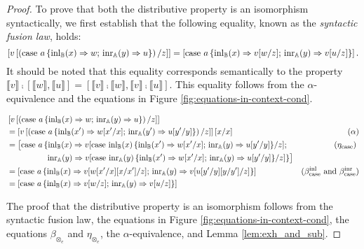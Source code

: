 \documentclass[10pt,a4paper]{amsart}
\theoremstyle{definition}
\theoremstyle{definition}
\theoremstyle{definition}
\theoremstyle{definition}
\theoremstyle{definition}
\theoremstyle{definition}
\begin{document}
\begin{proof}
 
  To prove that both the distributive property is an isomorphism syntactically, we first establish that the following equality, known  as the \emph{syntactic fusion law}, holds:
  \begin{equation*}
    \left[v\left[ \left(\text{case } a \,\{\mathrm{inl}_{\mathbb{B}}(x) \Rightarrow w ; \, \mathrm{inr}_{\mathbb{A}}(y) \Rightarrow u\}\right)  / z \right]\right] =   \left[\text{case } a \,\{\mathrm{inl}_{\mathbb{B}}(x) \Rightarrow v[w/z] ; \, \mathrm{inr}_{\mathbb{A}}(y) \Rightarrow v[u/z]\} \right].
  \end{equation*}
It should be noted that this equality corresponds semantically to the property  $ \llbracket v \rrbracket \comp [ \llbracket w \rrbracket,  \llbracket u \rrbracket] = [ \llbracket v \rrbracket \comp \llbracket w \rrbracket,\llbracket v \rrbracket \comp \llbracket u \rrbracket ] $.
This equality follows from the $\alpha$-equivalence and the equations in Figure \ref{fig:equations-in-context-cond}. 

\begin{align*}
  &\left[v\left[ \left(\text{case } a \,\{\mathrm{inl}_{\mathbb{B}}(x) \Rightarrow w ; \, \mathrm{inr}_{\mathbb{A}}(y) \Rightarrow u\}\right)  / z \right]\right] & \\
  & = \left[v\left[ \left(\text{case } a \,\{\mathrm{inl}_{\mathbb{B}}(x') \Rightarrow w[x'/x] ; \, \mathrm{inr}_{\mathbb{A}}(y') \Rightarrow u[y'/y]\}\right)  / z \right]\right] [x/x]  & (\alpha) \\
  & = \big[ \text{case } a \,\{\mathrm{inl}_{\mathbb{B}}(x) \Rightarrow v[\text{case } \mathrm{inl}_{\mathbb{B}}(x) \,\{\mathrm{inl}_{\mathbb{B}}(x') \Rightarrow w[x'/x] ; \, \mathrm{inr}_{\mathbb{A}}(y) \Rightarrow u[y'/y]\}/z] ; \, & (\eta_{\text{case}}) \ \\
   & \hspace{50pt} \mathrm{inr}_{\mathbb{A}}(y) \Rightarrow  v[\text{case } \mathrm{inr}_{\mathbb{A}}(y) \,\{\mathrm{inl}_{\mathbb{B}}(x') \Rightarrow w[x'/x] ; \, \mathrm{inr}_{\mathbb{A}}(y) \Rightarrow u[y'/y]\}/z]\}\big]  \\
   & = \left[\text{case } a \,\{\mathrm{inl}_{\mathbb{B}}(x) \Rightarrow v[w[x'/x][x/x']/z] ; \, \mathrm{inr}_{\mathbb{A}}(y) \Rightarrow v[u[y'/y][y/y']/z]\}\right]   & (\beta_{\text{case}}^{\text{inl}} \text{ and } \beta_{\text{case}}^{\text{inr}}  ) \\
   & = \left[ \text{case } a \,\{\mathrm{inl}_{\mathbb{B}}(x) \Rightarrow v[w/z] ; \, \mathrm{inr}_{\mathbb{A}}(y) \Rightarrow v[u/z]\}\right] 
\end{align*}

The proof that the distributive property is an isomorphism follows from the syntactic fusion law, the equations in Figure \ref{fig:equations-in-context-cond}, the equations $\beta_{\otimes_{e}}$ and $\eta_{\otimes_{e}}$, the $\alpha$-equivalence, and Lemma \ref{lem:exh_and_sub}. 


\end{proof}
\end{document}

